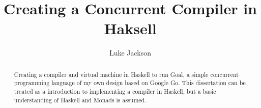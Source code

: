 \documentclass{report}
\author{Luke Jackson}
\title{Creating a Concurrent Compiler in Haksell}
\begin{document}
\maketitle

\begin{abstract}
Creating a compiler and virtual machine in Haskell to run Goal, a simple concurrent programming language of my own design based on Google Go. This dissertation can be treated as a introduction to implementing a compiler in Haskell, but a basic understanding of Haskell and Monads is assumed.
\end{abstract}

\tableofcontents











\end{document}
